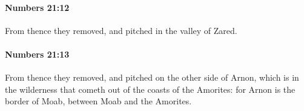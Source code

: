 		\paragraph{Numbers 21:12} %
			\label{NUMBERS-21-12}

			From thence they removed, and pitched in the valley of Zared.


		\paragraph{Numbers 21:13} %
			\label{NUMBERS-21-13}

			From thence they removed, and pitched on the other side of Arnon, which is in the wilderness that cometh out of the coasts of the Amorites: for Arnon is the border of Moab, between Moab and the Amorites.



